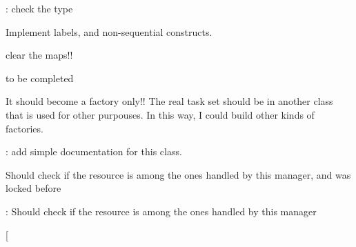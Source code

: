 
\begin{DoxyRefList}
\item[\label{todo__todo000001}%
\hypertarget{todo__todo000001}{}%
Global \hyperlink{classRTSim_1_1FPScheduler_1_1FPModel_aae8d0c7c46bac0f9178079d8d8dd0daf}{R\+T\+Sim\+:\+:F\+P\+Scheduler\+:\+:F\+P\+Model\+:\+:set\+Priority} (Tick p)]\+: check the type  
\item[\label{todo__todo000002}%
\hypertarget{todo__todo000002}{}%
Class \hyperlink{classRTSim_1_1Instr}{R\+T\+Sim\+:\+:Instr} ]Implement labels, and non-\/sequential constructs.  
\item[\label{todo__todo000005}%
\hypertarget{todo__todo000005}{}%
Global \hyperlink{classRTSim_1_1PIRManager_ae503c8b5ab06229f1c42d20bb06573f8}{R\+T\+Sim\+:\+:P\+I\+R\+Manager\+:\+:new\+Run} ()]clear the maps!!  
\item[\label{todo__todo000006}%
\hypertarget{todo__todo000006}{}%
Global \hyperlink{classRTSim_1_1PollingServer_ad29d9247dc3e8175587cec2f39f44e73}{R\+T\+Sim\+:\+:Polling\+Server\+:\+:get\+Virtual\+Time} ()]to be completed  
\item[\label{todo__todo000010}%
\hypertarget{todo__todo000010}{}%
Class \hyperlink{classRTSim_1_1RandomRTTaskSetFactory}{R\+T\+Sim\+:\+:Random\+R\+T\+Task\+Set\+Factory} ]It should become a factory only!! The real task set should be in another class that is used for other purpouses. In this way, I could build other kinds of factories.  
\item[\label{todo__todo000007}%
\hypertarget{todo__todo000007}{}%
Class \hyperlink{classRTSim_1_1ResManager}{R\+T\+Sim\+:\+:Res\+Manager} ]\+: add simple documentation for this class. 
\item[\label{todo__todo000009}%
\hypertarget{todo__todo000009}{}%
Global \hyperlink{classRTSim_1_1ResManager_afc45d40200d175850d3f7ed89c22e939}{R\+T\+Sim\+:\+:Res\+Manager\+:\+:release} (\hyperlink{classRTSim_1_1AbsRTTask}{Abs\+R\+T\+Task} $\ast$t, const std\+::string \&name, int n=1)]Should check if the resource is among the ones handled by this manager, and was locked before 
\item[\label{todo__todo000008}%
\hypertarget{todo__todo000008}{}%
Global \hyperlink{classRTSim_1_1ResManager_a2d83a47dc4ad6e795162bd84a82dc862}{R\+T\+Sim\+:\+:Res\+Manager\+:\+:request} (\hyperlink{classRTSim_1_1AbsRTTask}{Abs\+R\+T\+Task} $\ast$t, const std\+::string \&name, int n=1)]\+: Should check if the resource is among the ones handled by this manager 
\item[\label{todo__todo000003}%
\hypertarget{todo__todo000003}{}%

\end{DoxyRefList}

